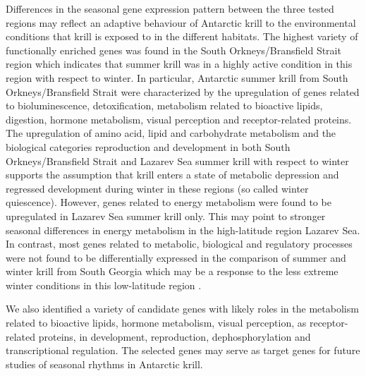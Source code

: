 Differences in the seasonal gene expression pattern between the three tested
regions may reflect an adaptive behaviour of Antarctic krill to the
environmental conditions that krill is exposed to in the different habitats.
The highest variety of functionally enriched genes was found in the South
Orkneys/Bransfield Strait region which indicates that summer krill was in a
highly active condition in this region with respect to winter. In particular,
Antarctic summer krill from South Orkneys/Bransfield Strait were characterized
by the upregulation of genes related to bioluminescence, detoxification,
metabolism related to bioactive lipids, digestion, hormone metabolism, visual
perception and receptor-related proteins. The upregulation of amino acid, lipid
and carbohydrate metabolism and the biological categories reproduction and
development in both South Orkneys/Bransfield Strait and Lazarev Sea summer
krill with respect to winter supports the assumption that krill enters a state
of metabolic depression and regressed development during winter in these
regions (so called winter quiescence). However, genes related to energy
metabolism were found to be upregulated in Lazarev Sea summer krill only. This
may point to stronger seasonal differences in energy metabolism in the
high-latitude region Lazarev Sea. In contrast, most genes related to metabolic,
biological and regulatory processes were not found to be differentially
expressed in the comparison of summer and winter krill from South Georgia which
may be a response to the less extreme winter conditions in this low-latitude
region \citep{meyer_winter_2017}.

We also identified a variety of candidate genes with likely roles in the
metabolism related to bioactive lipids, hormone metabolism, visual perception,
as receptor-related proteins, in development, reproduction, dephosphorylation
and transcriptional regulation. The selected genes may serve as target genes
for future studies of seasonal rhythms in Antarctic krill.

